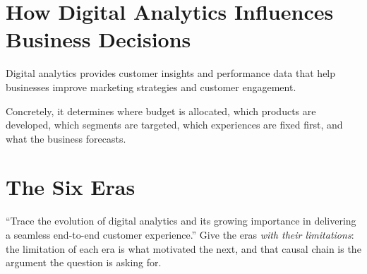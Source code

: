 \section{How Digital Analytics Influences Business Decisions}

\begin{exambox}
Digital analytics provides customer insights and performance data that help
businesses improve marketing strategies and customer engagement.

\smallskip
Concretely, it determines where budget is allocated, which products are
developed, which segments are targeted, which experiences are fixed first, and
what the business forecasts.
\end{exambox}

\section{The Six Eras}

\begin{keybox}
``Trace the evolution of digital analytics and its growing importance in
delivering a seamless end-to-end customer experience.''
Give the eras \emph{with their limitations}: the limitation of each era is what
motivated the next, and that causal chain is the argument the question is asking
for.
\end{keybox}

